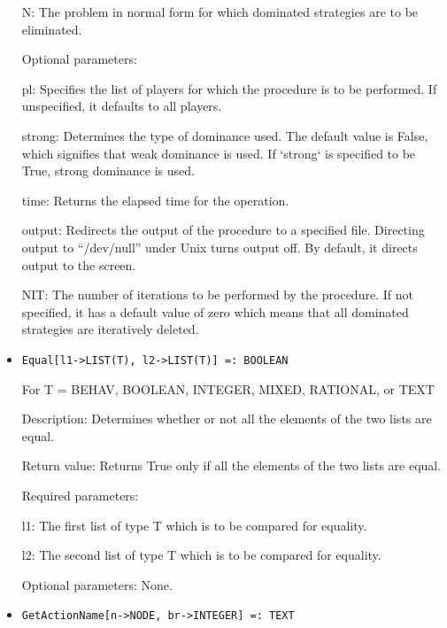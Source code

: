 \begin{itemize}
\bd
\item
[ N:] The problem in normal form for which dominated strategies are
to be eliminated.
\ed

\item
[Optional parameters:]\hfil\null

\bd
\item
[ pl:] Specifies the list of players for which the procedure is to
be performed.  If unspecified, it defaults to all players. 
\item
[ strong:] Determines the type of dominance used.  The default value
is False, which signifies that weak dominance is used.  If `strong` 
is specified to be True, strong dominance is used.  
\item
[ time:] Returns the elapsed time for the operation.
\item
[ output:] Redirects the output of the procedure to a specified 
file.  Directing output to ``/dev/null'' under Unix turns 
output off.  By default, it directs output to the screen.
\item
[ NIT:] The number of iterations to be performed by the procedure.
If not specified, it has a default value of zero which means 
that all dominated strategies are iteratively deleted.
\ed
\ed

\item
\protect \large \begin{verbatim}
Equal[l1->LIST(T), l2->LIST(T)] =: BOOLEAN
\end{verbatim}\normalsize

	For T = BEHAV, BOOLEAN, INTEGER, MIXED, RATIONAL, or TEXT

\bd
\item
[Description:] Determines whether or not all the elements of the two
lists are equal.
\item
[Return value:] Returns True only if all the elements of the two lists
are equal.
\item
[Required parameters:]\hfil\null 
	
\bd
\item
[l1:] The first list of type T which is to be compared for equality.
\item
[l2:] The second list of type T which is to be compared for 
equality.
\ed

\item
[Optional parameters:] None.

\ed

\item
\protect \large \begin{verbatim}
GetActionName[n->NODE, br->INTEGER] =: TEXT
\end{verbatim}\normalsize


\end{itemize}
